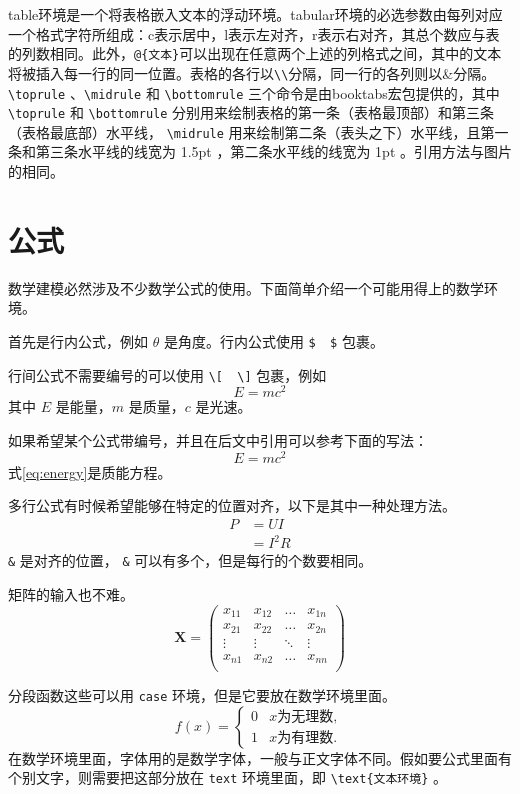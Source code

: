 \bigskip

table环境是一个将表格嵌入文本的浮动环境。tabular环境的必选参数由每列对应一个格式字符所组成：c表示居中，l表示左对齐，r表示右对齐，其总个数应与表的列数相同。此外，\verb|@{文本}|可以出现在任意两个上述的列格式之间，其中的文本将被插入每一行的同一位置。表格的各行以\verb|\\|分隔，同一行的各列则以\&分隔。 \verb|\toprule| 、\verb|\midrule| 和 \verb|\bottomrule| 三个命令是由booktabs宏包提供的，其中 \verb|\toprule| 和 \verb|\bottomrule| 分别用来绘制表格的第一条（表格最顶部）和第三条（表格最底部）水平线， \verb|\midrule| 用来绘制第二条（表头之下）水平线，且第一条和第三条水平线的线宽为 1.5pt ，第二条水平线的线宽为 1pt 。引用方法与图片的相同。

\section{公式}

数学建模必然涉及不少数学公式的使用。下面简单介绍一个可能用得上的数学环境。

首先是行内公式，例如 $ \theta $ 是角度。行内公式使用 \verb|$  $| 包裹。

行间公式不需要编号的可以使用 \verb|\[  \]| 包裹，例如
\[
E=mc^2
\]
其中 $ E $ 是能量，$ m $ 是质量，$ c $ 是光速。

如果希望某个公式带编号，并且在后文中引用可以参考下面的写法：
\begin{equation}
	E=mc^2
	\label{eq:energy}
\end{equation}
式\cref{eq:energy}是质能方程。

多行公式有时候希望能够在特定的位置对齐，以下是其中一种处理方法。
\begin{align}
	P & = UI \\
	& = I^2R
\end{align}
\verb|&| 是对齐的位置， \verb|&| 可以有多个，但是每行的个数要相同。

矩阵的输入也不难。
\[
\mathbf{X} = \left(
\begin{array}{cccc}
	x_{11} & x_{12} & \ldots & x_{1n}\\
	x_{21} & x_{22} & \ldots & x_{2n}\\
	\vdots & \vdots & \ddots & \vdots\\
	x_{n1} & x_{n2} & \ldots & x_{nn}\\
\end{array} \right)
\]

分段函数这些可以用 \verb|case| 环境，但是它要放在数学环境里面。
\[
f(x) =
\begin{cases}
	0 &  x \text{为无理数} ,\\
	1 &  x \text{为有理数} .
\end{cases}
\]
在数学环境里面，字体用的是数学字体，一般与正文字体不同。假如要公式里面有个别文字，则需要把这部分放在 \verb|text| 环境里面，即 \verb|\text{文本环境}| 。

